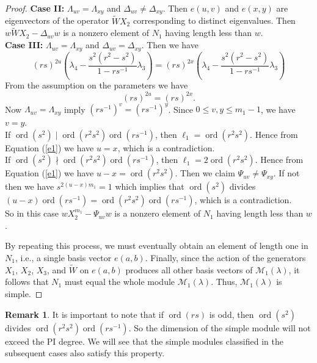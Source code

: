 \documentclass[12 pt,reqno]{amsart}
\numberwithin{equation}{section}
\DeclareMathOperator{\ord}{ord}
\theoremstyle{definition}
\newtheorem{remark}[thm]{Remark}
\theoremstyle{definition}
\theoremstyle{remark}
\theoremstyle{remark}
\begin{document}
\begin{proof}
    \noindent\textbf{Case II:} $\Lambda_{uv} = \Lambda_{xy}$ and $\Delta_{uv}\neq\Delta_{xy}$. Then $e(u,v)$ and $e(x,y)$ are eigenvectors of the operator $\tilde{W}X_2$ corresponding to distinct eigenvalues. Then $w\tilde{W}X_2-\Delta_{uv}w$ is a nonzero element of $N_1$ having length less than $w$.\\
    \textbf{Case III:} $\Lambda_{uv} = \Lambda_{xy}$ and $\Delta_{uv}=\Delta_{xy}$. Then we have 
    \[(rs)^{2u}\left(\lambda_4-\displaystyle\frac{s^2(r^2-s^2)}{1-rs^{-1}}\lambda_3\right)=(rs)^{2x}\left(\lambda_4-\displaystyle\frac{s^2(r^2-s^2)}{1-rs^{-1}}\lambda_3\right)\] From the assumption on the parameters we have 
    \begin{equation}\label{e1}
      (rs)^{2u}=(rs)^{2x}.  
    \end{equation}
     Now $\Lambda_{uv} = \Lambda_{xy}$ imply $(rs^{-1})^v=(rs^{-1})^y$. Since $0 \leq v,y \leq m_1-1$, we have $v=y$.\\
    If $\ord(s^2) \mid \ord(r^2s^2)\ord(rs^{-1})$, then $\ell_1=\ord(r^2s^2)$. Hence from Equation (\ref{e1}) we have $u=x$, which is a contradiction. \\
    If $\ord(s^2) \nmid \ord(r^2s^2)\ord(rs^{-1})$, then $\ell_1=2\ord(r^2s^2)$. Hence from Equation (\ref{e1}) we have $u-x=\ord(r^2s^2)$. Then we claim $\Psi_{uv}\neq \Psi_{xy}$. If not then we have $s^{2(u-x)m_1}=1$ which  implies that $\ord(s^2)$ divides $ (u-x)\ord(rs^{-1})=\ord(r^2s^2)\ord(rs^{-1})$, which is a contradiction.\\
    So in this case $wX_2^{m_1}-\Psi_{uv}w$ is a nonzero element of $N_1$ having length less than $w$.
    
    \noindent By repeating this process, we must eventually obtain an element of length one in $N_1$, i.e., a single basis vector $e(a,b)$. Finally, since the action of the generators $X_1$, $X_2$, $X_3$, and $\tilde{W}$ on $e(a,b)$ produces all other basis vectors of $\mathcal{M}_1(\lambda)$, it follows that $N_1$ must equal the whole module $\mathcal{M}_1(\lambda)$. Thus, $\mathcal{M}_1(\lambda)$ is simple.
\end{proof}
   \begin{remark}
It is important to note that if $\ord(rs)$ is odd, then $\ord(s^2)$ divides $\ord(r^2s^2)\ord(rs^{-1})$. So the dimension of the simple module will not exceed the PI degree. We will see that the simple modules classified in the subsequent cases also satisfy this property.
\end{remark}
\end{document}
